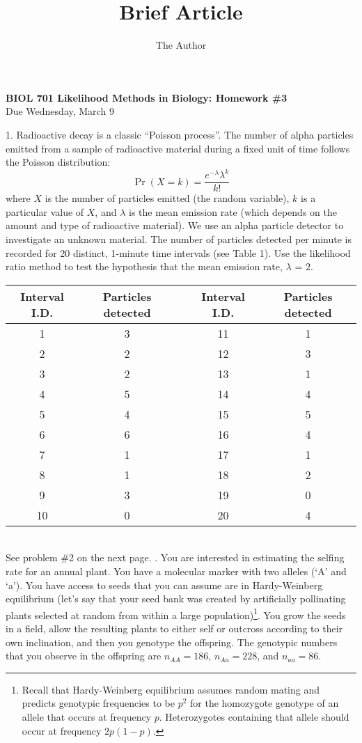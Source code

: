 \documentclass[11pt]{article}
\title{Brief Article}
\author{The Author}
\begin{document}
\begin{center}
	{\bf BIOL 701  Likelihood Methods in Biology: Homework \#3}\\
	{Due Wednesday, March 9} 
\end{center}
1. Radioactive decay is a classic ``Poisson process''.  The number of alpha particles emitted from a sample of radioactive material during a fixed unit of time follows the Poisson distribution:
$$\Pr(X=k) = \frac{e^{-\lambda}\lambda^k}{k!}$$
where $X$ is the number of particles emitted (the random variable), $k$ is a particular value of $X$, and $\lambda$ is the mean emission rate (which depends on the amount and type of radioactive material).
We use an alpha particle detector to investigate an unknown material.  The number of particles detected per minute is recorded for 20 distinct, 1-minute time intervals (see Table 1).  
Use the likelihood ratio method to test the hypothesis that the mean emission rate, $\lambda$ = 2.
\begin{table}[htdp]
\begin{center}
\begin{tabular}{c|cp{1in}c|c}
\hline
Interval	I.D. & Particles detected & & Interval	I.D. & Particles detected \\
\hline
1	& 3 & & 11	& 1 \\
2	& 2 & & 12	& 3 \\
3	& 2 & & 13	& 1 \\
4	& 5 & & 14	& 4 \\
5	& 4 & & 15	& 5 \\
6	& 6 & & 16	& 4 \\
7	& 1 & & 17	& 1 \\
8	& 1 & & 18	& 2 \\
9	& 3 & & 19	& 0 \\
10	& 0 & & 20	& 4 \\
\hline
\end{tabular}
\end{center}
\label{default}
\end{table}\\

See problem \#2 on the next page.
. You are interested in estimating the selfing rate for an annual plant.  You have a molecular marker with two alleles (`A' and `a'). You have access to seeds that you can assume are in Hardy-Weinberg equilibrium (let's say that your seed bank was created by artificially pollinating plants selected at random from within a large population)\footnote{Recall that Hardy-Weinberg equilibrium assumes random mating and predicts genotypic frequencies to be $p^2$ for the homozygote genotype of an allele that occurs at frequency $p$. Heterozygotes containing that allele should occur at frequency $2p(1-p)$.}.  You grow the seeds in a field, allow the resulting plants to either self or outcross according to their own inclination, and then you genotype the offspring.
The genotypic numbers that you observe in the offspring are $n_{AA} = 186$, $n_{Aa} = 228$, and $n_{aa} = 86$.
\end{document}
